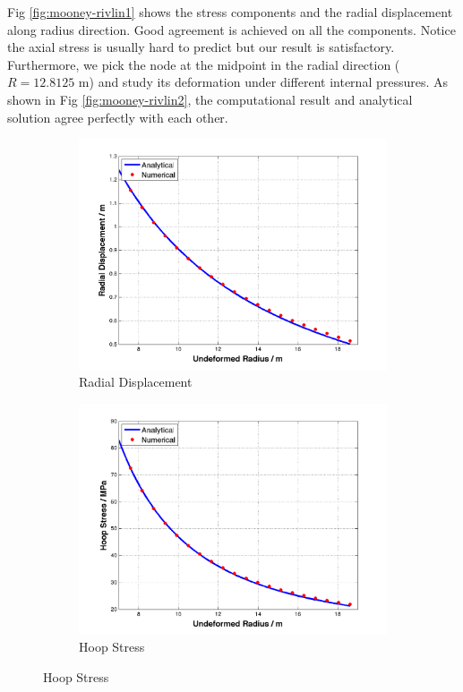 Fig \ref{fig:mooney-rivlin1} shows the stress components and the radial displacement along radius direction. Good agreement is achieved on all the components. Notice the axial stress is usually hard to predict but our result is satisfactory. Furthermore, we pick the node at the midpoint in the radial direction ($R = 12.8125$ m) and study its deformation under different internal pressures. As shown in Fig \ref{fig:mooney-rivlin2}, the computational result and analytical solution agree perfectly with each other. 

\begin{figure}[t!p]
	\begin{subfigure}[b]{0.5\textwidth}
		\centering
		\includegraphics[width=\textwidth]{./figures/ur_50.png}
		\caption{Radial Displacement}
		\label{ur_50}
	\end{subfigure}
	\begin{subfigure}[b]{0.5\textwidth}
		\centering
		\includegraphics[width=\textwidth]{./figures/hoop_stress_50.png}
		\caption{Hoop Stress}
		\label{hoop_50}
	\end{subfigure}
	

\end{figure}
